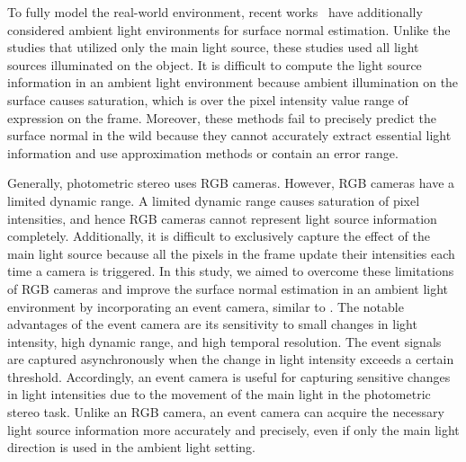 \documentclass[preprint,12pt,authoryear]{elsarticle}
\begin{document}
To fully model the real-world environment, recent works~\citep{hung2015photometric, hold2019single} have additionally considered  ambient light environments for surface normal estimation. Unlike the studies that utilized only the main light source, these studies used all light sources illuminated on the object. It is difficult to compute the light source information in an ambient light environment because ambient illumination on the surface causes saturation, which is over the pixel intensity value range of expression on the frame. Moreover, these methods fail to precisely predict the surface normal in the wild because they cannot accurately extract essential light information and use approximation methods or contain an error range.

Generally, photometric stereo uses RGB cameras. However, RGB cameras have a limited dynamic range. A limited dynamic range causes saturation of pixel intensities, and hence RGB cameras cannot represent light source information completely. Additionally, it is difficult to exclusively capture the effect of the main light source because all the pixels in the frame update their intensities each time a camera is triggered. In this study, we aimed to overcome these limitations of RGB cameras and improve the surface normal estimation in an ambient light environment by incorporating an event camera, similar to \citep{lichtsteiner2008128, posch2010qvga, brandli2014240}. The notable advantages of the event camera are its sensitivity to small changes in light intensity, high dynamic range, and high temporal resolution. The event signals are captured asynchronously when the change in light intensity exceeds a certain threshold. Accordingly, an event camera is useful for capturing sensitive changes in light intensities due to the movement of the main light in the photometric stereo task. Unlike an RGB camera, an event camera can acquire the necessary light source information more accurately and precisely, even if only the main light direction is used in the ambient light setting.
\end{document}
